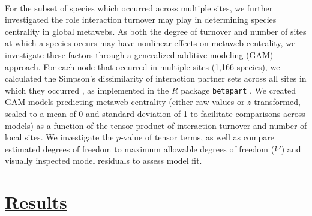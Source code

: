 \paragraph{}
For the subset of species which occurred across multiple sites, we further investigated the role interaction turnover may play in determining species centrality in global metawebs. As both the degree of turnover and number of sites at which a species occurs may have nonlinear effects on metaweb centrality, we investigate these factors through a generalized additive modeling (GAM) approach. For each node that occurred in multiple sites (1,166 species), we calculated the Simpson's dissimilarity of interaction partner sets across all sites in which they occurred \parencite{baselga2015comparing}, as implemented in the $R$ package \texttt{betapart} \parencite{baselga2012betapart}. We created GAM models predicting metaweb centrality (either raw values or $z$-transformed, scaled to a mean of 0 and standard deviation of 1 to facilitate comparisons across models) as a function of the tensor product of interaction turnover and number of local sites. We investigate the $p$-value of tensor terms, as well as compare estimated degrees of freedom to maximum allowable degrees of freedom ($k'$) and visually inspected model residuals to assess model fit. %



\section*{\textbf{\underline{Results}}}

